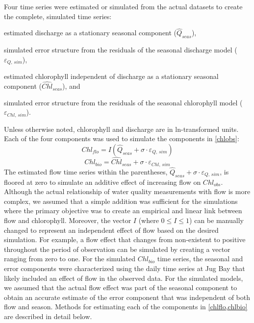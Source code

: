 \documentclass[letterpaper,12pt,oneside]{article}\usepackage[]{graphicx}\usepackage[]{color}
\begin{document}
Four time series were estimated or simulated from the actual datasets to create the complete, simulated time series:\begin{inparaenum}[1\upshape)]
\item estimated discharge as a stationary seasonal component ($\hat{Q}_{seas}$),
\item simulated error structure from the residuals of the seasonal discharge model ($\varepsilon_{Q,\,sim}$), 
\item estimated chlorophyll independent of discharge as a stationary seasonal component ($\hat{Chl}_{seas}$), and
\item simulated error structure from the residuals of the seasonal chlorophyll model ($\varepsilon_{Chl,\,sim}$).
\end{inparaenum}
Unless otherwise noted, chlorophyll and discharge are in ln-transformed units.  Each of the four components was used to simulate the components in \cref{chlobs}:
\begin{equation} \label{chlflo}
Chl_{flo} = I\left(\hat{Q}_{seas} + \sigma\cdot\varepsilon_{Q,\,sim}\right)
\end{equation}
\begin{equation} \label{chlbio}
Chl_{bio} = \hat{Chl}_{seas} + \sigma\cdot\varepsilon_{Chl,\,sim}
\end{equation}
The estimated flow time series within the parentheses, $\hat{Q}_{seas} + \sigma\cdot\varepsilon_{Q,\,sim}$, is floored at zero to simulate an additive effect of increasing flow on $Chl_{obs}$.  Although the actual relationship of water quality measurements with flow is more complex, we assumed that a simple addition was sufficient for the simulations where the primary objective was to create an empirical and linear link between flow and chlorophyll. Moreover, the vector $I$ (where $0 \leq I \leq 1$) can be manually changed to represent an independent effect of flow based on the desired simulation.  For example, a flow effect that changes from non-existent to positive throughout the period of observation can be simulated by creating a vector ranging from zero to one. For the simulated $Chl_{bio}$ time series, the seasonal and error components were characterized using the daily time series at Jug Bay that likely included an effect of flow in the observed data.  For the simulated models, we assumed that the actual flow effect was part of the seasonal component to obtain an accurate estimate of the error component that was independent of both flow and season.  Methods for estimating each of the components in \cref{chlflo,chlbio} are described in detail below. 
\end{document}

